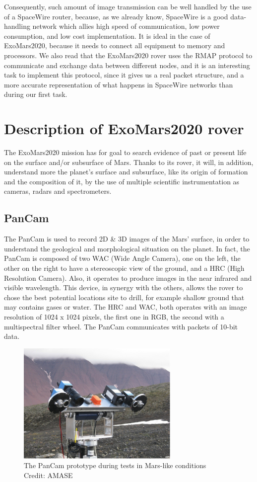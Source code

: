 \documentclass[12pt,a4paper]{article}
\begin{document}
Consequently, such amount of image transmission can be well handled by the use of a SpaceWire router, because, as we already know, SpaceWire is a good data-handling network which allies high speed of communication, low power consumption, and low cost implementation. It is ideal in the case of ExoMars2020, because it needs to connect all equipment to memory and processors. We also read that the ExoMars2020 rover uses the RMAP protocol to communicate and exchange data between different nodes, and it is an interesting task to implement this protocol, since it gives us a real packet structure, and a more accurate representation of what happens in SpaceWire networks than during our first task.\pagebreak
\section{Description of ExoMars2020 rover}

The ExoMars2020 mission has for goal to search evidence of past or present life on the surface and/or subsurface of Mars. Thanks to its rover, it will, in addition, understand more the planet's surface and subsurface, like its origin of formation and the composition of it, by the use of multiple scientific instrumentation as cameras, radars and spectrometers.\smallbreak

\subsection{PanCam}
The PanCam is used to record 2D \& 3D images of the Mars' surface, in order to understand the geological and morphological situation on the planet. In fact, the PanCam is composed of two WAC (Wide Angle Camera), one on the left, the other on the right to have a stereoscopic view of the ground, and a HRC (High Resolution Camera). Also, it operates to produce images in the near infrared and visible wavelength. This device, in synergy with the others, allows the rover to chose the best potential locations site to drill, for example shallow ground that may contains gases or water. The HRC and WAC, both operates with an image resolution of 1024 x 1024 pixels, the first one in RGB, the second with a multispectral filter wheel. The PanCam communicates with packets of 10-bit data.

\begin{figure}[h]
\centering
\includegraphics[scale=1]{pictures/PanCam.jpg}
\caption{The PanCam prototype during tests in Mars-like conditions\\Credit: AMASE}
\end{figure}
\end{document}
